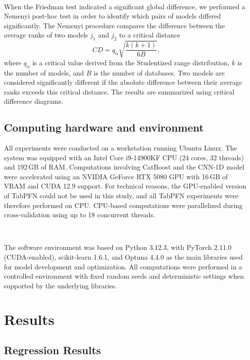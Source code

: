 \documentclass{article}
\begin{document}
~

When the Friedman test indicated a significant global difference, we performed a Nemenyi post-hoc test \cite{nemenyi_posthoc_test} in order to identify which pairs of models differed significantly. The Nemenyi procedure compares the difference between the average ranks of two models $j_1$ and $j_2$ to a critical distance
\[
CD = q_{\alpha} \sqrt{\frac{k(k+1)}{6B}},
\]
where $q_{\alpha}$ is a critical value derived from the Studentized range distribution, $k$ is the number of models, and $B$ is the number of databases. Two models are considered significantly different if the absolute difference between their average ranks exceeds this critical distance. The results are summarized using critical difference diagrams.





\subsection{Computing hardware and environment}

All experiments were conducted on a workstation running Ubuntu Linux. The system was equipped with an Intel Core i9-14900KF CPU (24 cores, 32 threads) and 192\,GB of RAM. Computations involving CatBoost and the CNN-1D model were accelerated using an NVIDIA GeForce RTX 5080 GPU with 16\,GB of VRAM and CUDA 12.9 support. For technical reasons, the GPU-enabled version of TabPFN could not be used in this study, and all TabPFN experiments were therefore performed on CPU. CPU-based computations were parallelized during cross-validation using up to 18 concurrent threads.

~

The software environment was based on Python 3.12.3, with PyTorch 2.11.0 (CUDA-enabled), scikit-learn 1.6.1, and Optuna 4.4.0 as the main libraries used for model development and optimization. All computations were performed in a controlled environment with fixed random seeds and deterministic settings when supported by the underlying libraries.







\section{Results} \label{sec:results}

\subsection{Regression Results}
\end{document}
